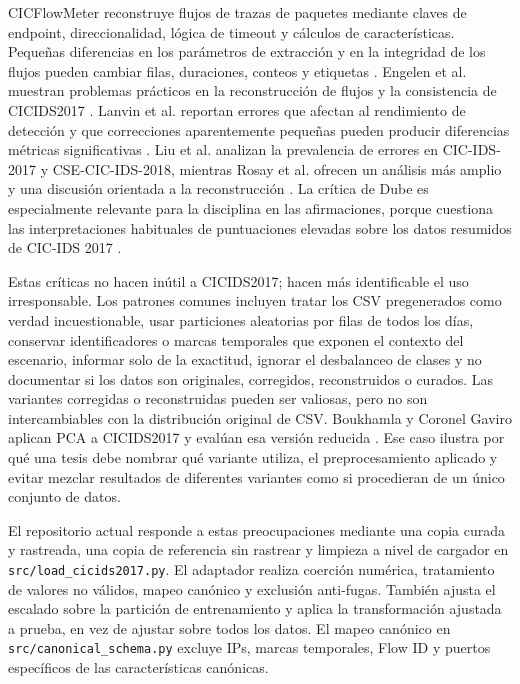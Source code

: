CICFlowMeter reconstruye flujos de trazas de paquetes mediante claves de endpoint, direccionalidad, lógica de timeout y cálculos de características. Pequeñas diferencias en los parámetros de extracción y en la integridad de los flujos pueden cambiar filas, duraciones, conteos y etiquetas \parencite{Pekar2024NFStream}. Engelen et al. muestran problemas prácticos en la reconstrucción de flujos y la consistencia de CICIDS2017 \parencite{Engelen2021CICIDSIssues}. Lanvin et al. reportan errores que afectan al rendimiento de detección y que correcciones aparentemente pequeñas pueden producir diferencias métricas significativas \parencite{Lanvin2023Errors,FaultyUseCICIDS2017}. Liu et al. analizan la prevalencia de errores en CIC-IDS-2017 y CSE-CIC-IDS-2018, mientras Rosay et al. ofrecen un análisis más amplio y una discusión orientada a la reconstrucción \parencite{Liu2022ErrorPrevalenceNIDS,Rosay2022CICIDS2017Analysis}. La crítica de Dube es especialmente relevante para la disciplina en las afirmaciones, porque cuestiona las interpretaciones habituales de puntuaciones elevadas sobre los datos resumidos de CIC-IDS 2017 \parencite{Dube2024FaultyCICIDS2017}.

Estas críticas no hacen inútil a CICIDS2017; hacen más identificable el uso irresponsable. Los patrones comunes incluyen tratar los CSV pregenerados como verdad incuestionable, usar particiones aleatorias por filas de todos los días, conservar identificadores o marcas temporales que exponen el contexto del escenario, informar solo de la exactitud, ignorar el desbalanceo de clases y no documentar si los datos son originales, corregidos, reconstruidos o curados. Las variantes corregidas o reconstruidas pueden ser valiosas, pero no son intercambiables con la distribución original de CSV. Boukhamla y Coronel Gaviro aplican PCA a CICIDS2017 y evalúan esa versión reducida \parencite{Boukhamla2021CICIDS2017Validation}. Ese caso ilustra por qué una tesis debe nombrar qué variante utiliza, el preprocesamiento aplicado y evitar mezclar resultados de diferentes variantes como si procedieran de un único conjunto de datos.

El repositorio actual responde a estas preocupaciones mediante una copia curada y rastreada, una copia de referencia sin rastrear y limpieza a nivel de cargador en \texttt{src/load\_cicids2017.py}. El adaptador realiza coerción numérica, tratamiento de valores no válidos, mapeo canónico y exclusión anti-fugas. También ajusta el escalado sobre la partición de entrenamiento y aplica la transformación ajustada a prueba, en vez de ajustar sobre todos los datos. El mapeo canónico en \texttt{src/canonical\_schema.py} excluye IPs, marcas temporales, Flow ID y puertos específicos de las características canónicas.

